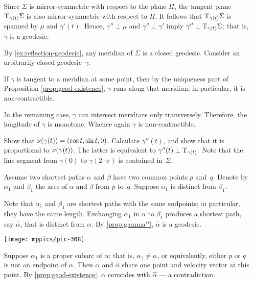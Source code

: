 \begin{multicols}{2}
Since $\Sigma$ is mirror-symmetric with respect to the plane $\Pi$,
the tangent plane $\mathrm{T}_{\gamma(t)}\Sigma$ is also mirror-symmetric with respect to $\Pi$.
It follows that $\mathrm{T}_{\gamma(t)}\Sigma$ is spanned by $\mu$ and $\gamma'(t)$.
Hence, $\gamma''\perp \mu$ and $\gamma''\perp\gamma'$ imply $\gamma''\perp\mathrm{T}_{\gamma(t)}\Sigma$;
that is, $\gamma$ is a geodesic.



By \ref{ex:reflection-geodesic}, any meridian of $\Sigma$ is a closed geodesic.
Consider an arbitrarily closed geodesic~$\gamma$.

If $\gamma$ is tangent to a meridian at some point, then by the uniqueness part of Proposition \ref{prop:geod-existence}, $\gamma$ runs along that meridian;
in particular, it is non-contractible.

In the remaining case, $\gamma$ can intersect meridians only transversely.
Therefore, the longitude of $\gamma$ is monotone.
Whence again $\gamma$ is non-contractible.

Show that $\nu(\gamma(t))=(\cos t,\sin t, 0)$.
Calculate $\gamma''(t)$, and show that it is proportional to $\nu(\gamma(t))$.
The latter is equivalent to $\gamma''(t)\perp\mathrm{T}_{\gamma(t)}$. 
Note that the line segment from $\gamma (0) $ to $\gamma (2{\cdot}\pi) $ is contained in~$\Sigma$.

Assume two shortest paths $\alpha$ and $\beta$ have two common points $p$ and~$q$.
Denote by $\alpha_1$ and $\beta_1$ the arcs of $\alpha$ and $\beta$ from $p$ to~$q$.
Suppose $\alpha_1$ is distinct from $\beta_1$.

Note that $\alpha_1$ and $\beta_1$ are shortest paths with the same endpoints;
in particular, they have the same length.
Exchanging $\alpha_1$ in $\alpha$ to $\beta_1$ produces a shortest path, say $\hat\alpha$, that is distinct from $\alpha$.
By \ref{prop:gamma''}, $\hat\alpha$ is a geodesic.

\begin{Figure}
\vskip-0mm
\centering
\texttt{[image: mppics/pic-308]}
\vskip0mm
\end{Figure}

Suppose $\alpha_1$ is a proper subarc of $\alpha$;
that is, $\alpha_1\ne\alpha$, or equivalently, either $p$ or $q$ is not an endpoint of $\alpha$.
Then $\alpha$ and $\hat\alpha$ share one point and velocity vector at this point.
By \ref{prop:geod-existence}, $\alpha$ coincides with $\hat\alpha$ --- a contradiction.


\end{multicols}
